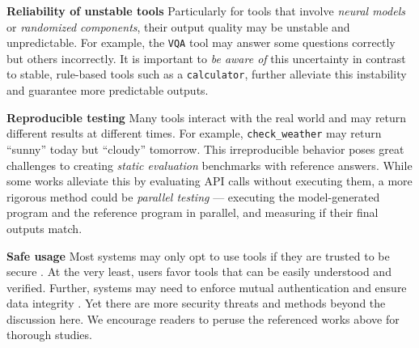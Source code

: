 \noindent \textbf{Reliability of unstable tools} \quad
Particularly for tools that involve \textit{neural models} or \textit{randomized components}, their output quality may be unstable and unpredictable. For example, the \texttt{VQA} tool \citep{gupta2022visual} may answer some questions correctly but others incorrectly.
It is important to \textit{be aware of} this uncertainty in contrast to stable, rule-based tools such as a \texttt{calculator}, further alleviate this instability and guarantee more predictable outputs.

\noindent \textbf{Reproducible testing} \quad
Many tools interact with the real world and may return different results at different times. For example, \texttt{check\_weather} may return ``sunny'' today but ``cloudy'' tomorrow. This irreproducible behavior poses great challenges to creating \textit{static evaluation} benchmarks with reference answers. %
While some works alleviate this by evaluating API calls without executing them, a more rigorous method could be \textit{parallel testing} \citep{sharma2018automated} --- executing the model-generated program and the reference program in parallel, and measuring if their final outputs match.

\noindent \textbf{Safe usage} \quad
Most systems may only opt to use tools if they are trusted to be secure \citep{barbir2007challenges}.
At the very least, users favor tools that can be easily understood and verified. Further, systems may need to enforce mutual authentication and ensure data integrity \citep{ehsan2022restful}.
Yet there are more security threats and methods beyond the discussion here. We encourage readers to peruse the referenced works above for thorough studies.
